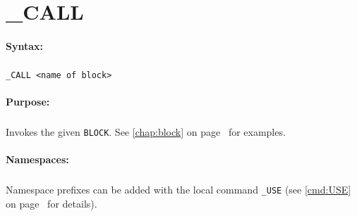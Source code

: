 
\newpage
\section{\_CALL}
\label{cmd:_CALL}

\paragraph{Syntax:}
\subparagraph{}
\texttt{\_CALL <name of block>}

\paragraph{Purpose:}
\subparagraph{}
Invokes the given \texttt{BLOCK}. See \autoref{chap:block} 
on page~\pageref{chap:block} for examples.

\paragraph{Namespaces:}
\subparagraph{}
Namespace prefixes can be added with the local 
command \texttt{\_USE} (see \autoref{cmd:USE} 
on page~\pageref{cmd:USE} for details).
